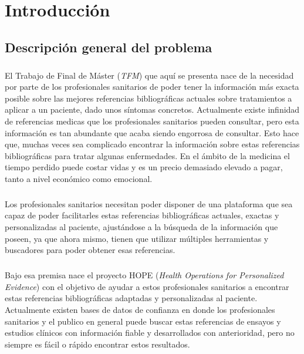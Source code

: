 \chapter{Introducción}
\label{chapter:introduccion}


\section{Descripción general del problema}
\label{def:def1}

\paragraph{}
El Trabajo de Final de Máster (\textit{TFM}) que aquí se presenta nace de la necesidad por parte de los profesionales sanitarios de poder tener la información más exacta posible sobre las mejores referencias bibliográficas actuales sobre tratamientos a aplicar a un paciente, dado unos síntomas concretos. Actualmente existe infinidad de referencias medicas que los profesionales sanitarios pueden consultar, pero esta información es tan abundante que acaba siendo engorrosa de consultar\cite{ref:search_internet}. Esto hace que, muchas veces sea complicado encontrar la información sobre estas referencias bibliográficas para tratar algunas enfermedades. En el ámbito de la medicina el tiempo perdido puede costar vidas y es un precio demasiado elevado a pagar, tanto a nivel económico como emocional.

\paragraph{}
Los profesionales sanitarios necesitan poder disponer de una plataforma que sea capaz de poder facilitarles estas referencias bibliográficas actuales, exactas y personalizadas al paciente, ajustándose a la búsqueda de la información que poseen, ya que ahora mismo, tienen que utilizar múltiples herramientas y buscadores para poder obtener esas referencias\cite{ref:busqueda_relevante}.

\paragraph{}
Bajo esa premisa nace el proyecto HOPE\cite{ref:hope_home} (\textit{Health Operations for Personalized Evidence}) con el objetivo de ayudar a estos profesionales sanitarios a encontrar estas referencias bibliográficas adaptadas y personalizadas al paciente. Actualmente existen bases de datos de confianza en donde los profesionales sanitarios y el publico en general puede buscar estas referencias de ensayos y estudios clínicos con información fiable y desarrollados con anterioridad, pero no siempre es fácil o rápido encontrar estos resultados\cite{ref:search_results_study}.

